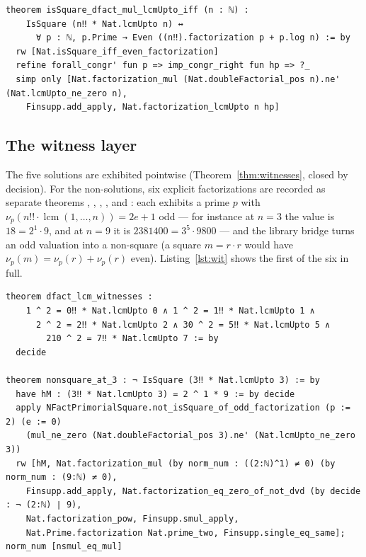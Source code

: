 \documentclass[11pt]{article}
\theoremstyle{definition}
\begin{document}
\begin{lstlisting}[caption={The valuation criterion (Lemma~\ref{lem:A}): the
criterion bridge in full.},label={lst:crit}]
theorem isSquare_dfact_mul_lcmUpto_iff (n : ℕ) :
    IsSquare (n‼ * Nat.lcmUpto n) ↔
      ∀ p : ℕ, p.Prime → Even ((n‼).factorization p + p.log n) := by
  rw [Nat.isSquare_iff_even_factorization]
  refine forall_congr' fun p => imp_congr_right fun hp => ?_
  simp only [Nat.factorization_mul (Nat.doubleFactorial_pos n).ne' (Nat.lcmUpto_ne_zero n),
    Finsupp.add_apply, Nat.factorization_lcmUpto n hp]
\end{lstlisting}

\subsection{The witness layer}

The five solutions are exhibited pointwise
(Theorem~\ref{thm:witnesses}, closed by decision). For the non-solutions, six
explicit factorizations are recorded as separate theorems
, , ,
,  and
: each exhibits a prime $p$ with
$\nu_p(n!! \cdot \operatorname{lcm}(1,\dots,n)) = 2e+1$ odd --- for instance
at $n = 3$ the value is $18 = 2^1 \cdot 9$, and at $n = 9$ it is
$2381400 = 3^5 \cdot 9800$ --- and the library bridge
 turns an odd valuation into a
non-square (a square $m = r \cdot r$ would have
$\nu_p(m) = \nu_p(r) + \nu_p(r)$ even). Listing~\ref{lst:wit} shows the first
of the six in full.

\begin{lstlisting}[caption={The first explicit non-square witness (at $n = 3$)
and the witness layer for the five solutions.},label={lst:wit}]
theorem dfact_lcm_witnesses :
    1 ^ 2 = 0‼ * Nat.lcmUpto 0 ∧ 1 ^ 2 = 1‼ * Nat.lcmUpto 1 ∧
      2 ^ 2 = 2‼ * Nat.lcmUpto 2 ∧ 30 ^ 2 = 5‼ * Nat.lcmUpto 5 ∧
        210 ^ 2 = 7‼ * Nat.lcmUpto 7 := by
  decide

theorem nonsquare_at_3 : ¬ IsSquare (3‼ * Nat.lcmUpto 3) := by
  have hM : (3‼ * Nat.lcmUpto 3) = 2 ^ 1 * 9 := by decide
  apply NFactPrimorialSquare.not_isSquare_of_odd_factorization (p := 2) (e := 0)
    (mul_ne_zero (Nat.doubleFactorial_pos 3).ne' (Nat.lcmUpto_ne_zero 3))
  rw [hM, Nat.factorization_mul (by norm_num : ((2:ℕ)^1) ≠ 0) (by norm_num : (9:ℕ) ≠ 0),
    Finsupp.add_apply, Nat.factorization_eq_zero_of_not_dvd (by decide : ¬ (2:ℕ) ∣ 9),
    Nat.factorization_pow, Finsupp.smul_apply,
    Nat.Prime.factorization Nat.prime_two, Finsupp.single_eq_same]; norm_num [nsmul_eq_mul]
\end{lstlisting}
\end{document}
